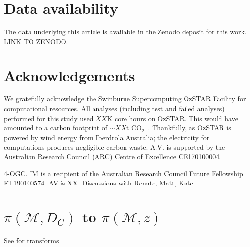\documentclass[twocolumn]{aastex631}
\begin{document}
\section*{Data availability}
The data underlying this article is available in the Zenodo deposit for this work. LINK TO ZENODO.

\section*{Acknowledgements}
We gratefully acknowledge the Swinburne Supercomputing OzSTAR Facility for computational resources. All analyses (including test and failed analyses) performed for this study used $XX$K core hours on OzSTAR. This would have amounted to a carbon footprint of ${\sim XX{\text{t CO}_2}}$~\citep{greenhouse, energy_to_co2_converter}. Thankfully, as OzSTAR is powered by wind energy from Iberdrola Australia; the electricity for computations produces negligible carbon waste.
A.V. is supported by the Australian Research Council (ARC) Centre of Excellence CE170100004.

4-OGC.
IM is a recipient of the Australian Research Council Future Fellowship FT190100574.
AV is XX.
Discussions with Renate, Matt, Kate.

%
%









\appendix

\section{$\pi(\mathcal{M}, D_{C})$ to $\pi(\mathcal{M}, z)$}

See \cite{Hogg:1999:arXiv} for transforms
\end{document}
